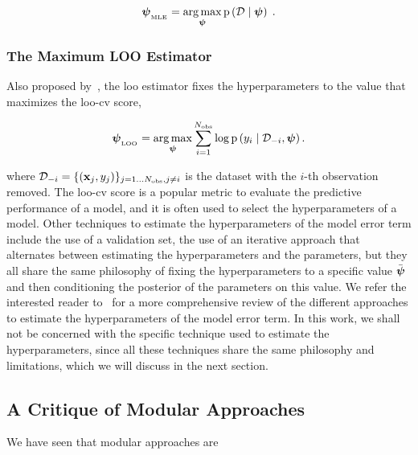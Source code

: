\begin{equation}
    \boldsymbol{\psi}_{_\mathrm{MLE}} = \operatorname*{arg\,max}_{\boldsymbol{\psi}} \mathrm{p} \left( \mathcal{D} \mid \boldsymbol{\psi} \right)\;.
\end{equation}

\subsubsection{The Maximum LOO Estimator}
Also proposed by~\cite{Bachoc2013}, the \gls{loo} estimator fixes the hyperparameters to the value that maximizes the \gls{loo}-\gls{cv} score,

\begin{equation}
    \boldsymbol{\psi}_{_\mathrm{LOO}} = \operatorname*{arg\,max}_{\boldsymbol{\psi}} \sum_{i=1}^{N_{\mathrm{obs}}} \log \mathrm{p} \left( y_i \mid \mathcal{D}_{-i}, \boldsymbol{\psi} \right).
\end{equation}

where $\mathcal{D}_{-i} = \{(\mathbf{x}_j, y_j)\}_{j=1\ldots N_{\mathrm{obs}}, j\neq i}$ is the dataset with the $i$-th observation removed. The \gls{loo}-\gls{cv} score is a popular metric to evaluate the predictive performance of a model, and it is often used to select the hyperparameters of a model.
Other techniques to estimate the hyperparameters of the model error term include the use of a validation set, the use of an iterative approach that alternates between estimating the hyperparameters and the parameters, but they all share the same philosophy of fixing the hyperparameters to a specific value $\bar{\boldsymbol{\psi}}$ and then conditioning the posterior of the parameters on this value. We refer the interested reader to~\cite{leoni} for a more comprehensive review of the different approaches to estimate the hyperparameters of the model error term. In this work, we shall not be concerned with the specific technique used to estimate the hyperparameters, since all these techniques share the same philosophy and limitations, which we will discuss in the next section.

\subsection{A Critique of Modular Approaches}

We have seen that modular approaches are 

